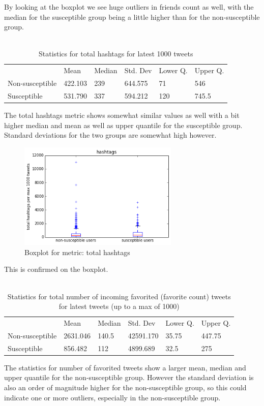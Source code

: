 \documentclass[10pt]{IEEEtran}
\begin{document}
By looking at the boxplot we see huge outliers in friends count as well, with the median for the susceptible group being a little higher than for the non-susceptible group.\\\\
\begin{table}[ht!]
\begin{tabular}{llllll}
\textbf{}       & Mean    & Median & Std. Dev & Lower Q. & Upper Q. \\
Non-susceptible & 422.103 & 239    & 644.575  & 71     & 546        \\
Susceptible     & 531.790 & 337    & 594.212  & 120    &  745.5    
\end{tabular}
\caption{Statistics for total hashtags for latest 1000 tweets}
\end{table}
The total hashtags metric shows somewhat similar values as well with a bit higher median and mean as well as upper quantile for the susceptible group. Standard deviations for the two groups are somewhat high however.
\begin{figure}[H]
  \centering
  \includegraphics[width=3.0in]{total_hashtags_boxplot}
  \caption{Boxplot for metric: total hashtags}
  \label{fig:hashtags_boxplot}
\end{figure}
This is confirmed on the boxplot.\\\\
\begin{table}[ht!]
\begin{tabular}{llllll}
\textbf{}       & Mean     & Median & Std. Dev  & Lower Q. & Upper Q. \\
Non-susceptible & 2631.046 & 140.5  & 42591.170 & 35.75  & 447.75     \\
Susceptible     & 856.482  & 112    & 4899.689  & 32.5     &  275    
\end{tabular}
\caption{Statistics for total number of incoming favorited (favorite count) tweets for latest tweets (up to a max of 1000)}
\end{table}
The statistics for number of favorited tweets show a larger mean, median and upper quantile for the non-susceptible group. However the standard deviation is also an order of magnitude higher for the non-susceptible group, so this could indicate one or more outliers, especially in the non-susceptible group.
\end{document}
